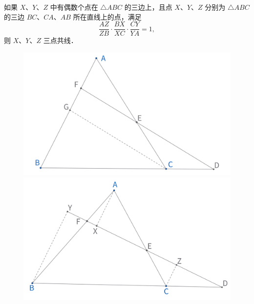 \begin{theorem}
如果 $X 、 Y 、 Z$ 中有偶数个点在 $\triangle A B C$ 的三边上，且点 $X 、 Y 、 Z$ 分别为 $\triangle A B C$ 的三边 $B C 、 C A 、 A B$ 所在直线上的点，满足 
$$\frac{A Z}{Z B} \cdot \frac{B X}{X C} \cdot \frac{C Y}{Y A}=1,$$
则 $X 、 Y 、 Z$ 三点共线．
\end{theorem}



\begin{figure}[H]
    \centering
    \hfill %
    \begin{minipage}[t]{0.45\textwidth}
        \centering
        \includegraphics[width=\linewidth]{figures/menelaus-proof1.png}
    \end{minipage}
    \hfill %
    \begin{minipage}[t]{0.45\textwidth}
    \centering
    \includegraphics[width=\linewidth]{figures/menelaus-proof2.png}
    \end{minipage}
\end{figure}

